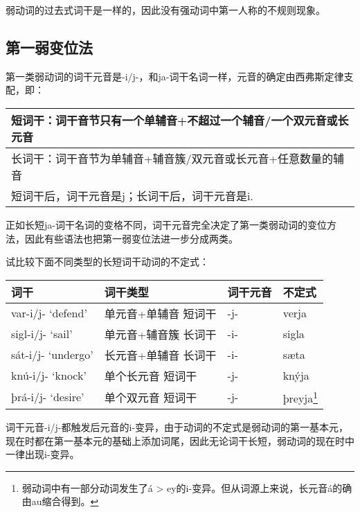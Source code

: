 弱动词的过去式词干是一样的，因此没有强动词中第一人称的不规则现象。

\subsection{第一弱变位法}\label{第一弱变位法}

第一类弱动词的词干元音是-i/j-，和ja-词干名词一样，元音的确定由西弗斯定律支配，即：

\begin{longtable}{l}
  \toprule
  短词干：词干音节只有一个单辅音+不超过一个辅音/一个双元音或长元音 \\
  \midrule
  \endhead
  \bottomrule
  \endfoot
  长词干：词干音节为单辅音+辅音簇/双元音或长元音+任意数量的辅音    \\
  短词干后，词干元音是j；长词干后，词干元音是i.                    \\
\end{longtable}

正如长短ja-词干名词的变格不同，词干元音完全决定了第一类弱动词的变位方法，因此有些语法也把第一弱变位法进一步分成两类。

试比较下面不同类型的长短词干动词的不定式：

\begin{longtable}{llll}
  \toprule
  词干               & 词干类型             & 词干元音 & 不定式                                      \\
  \midrule
  \endhead
  \bottomrule
  \endfoot
  var-i/j- `defend‌'  & 单元音+单辅音 短词干 & -j-      & verja                                       \\
  sigl-i/j- `sail‌'   & 单元音+辅音簇 长词干 & -i-      & sigla                                       \\
  sát-i/j- `undergo‌' & 长元音+单辅音 长词干 & -i-      & sæta                                        \\
  knú-i/j- `knock'   & 单个长元音 短词干    & -j-      & knýja                                       \\
  þrá-i/j- `desire'  & 单个双元音 短词干    & -j-      & þreyja\footnote{弱动词中有一部分动词发生了á
  \textgreater{} ey的i-变异。但从词源上来说，长元音á的确由au缩合得到。}                              \\
\end{longtable}

词干元音-i/j-都触发后元音的i-变异，由于动词的不定式是弱动词的第一基本元，现在时都在第一基本元的基础上添加词尾，因此无论词干长短，弱动词的现在时中一律出现i-变异。

